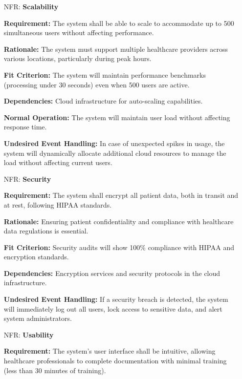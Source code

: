 \documentclass[12pt]{article}
\newcounter{nfrnum} %
\begin{document}
\begin{itemize}
\item[NFR\refstepcounter{nfrnum}\thenfrnum \label{NFR_Scalability}:] \textbf{Scalability}  

    \textbf{Requirement:} The system shall be able to scale to accommodate up to 500 simultaneous users without affecting performance.  
  
    \textbf{Rationale:} The system must support multiple healthcare providers across various locations, particularly during peak hours.  
  
    \textbf{Fit Criterion:} The system will maintain performance benchmarks (processing under 30 seconds) even when 500 users are active.  
  
    \textbf{Dependencies:} Cloud infrastructure for auto-scaling capabilities.  
  
    \textbf{Normal Operation:} The system will maintain user load without affecting response time.  
  
    \textbf{Undesired Event Handling:} In case of unexpected spikes in usage, the system will dynamically allocate additional cloud resources to manage the load without affecting current users.

\item[NFR\refstepcounter{nfrnum}\thenfrnum \label{NFR_Security}:] \textbf{Security}  

    \textbf{Requirement:} The system shall encrypt all patient data, both in transit and at rest, following HIPAA standards.  
  
    \textbf{Rationale:} Ensuring patient confidentiality and compliance with healthcare data regulations is essential.  
  
    \textbf{Fit Criterion:} Security audits will show 100\% compliance with HIPAA and encryption standards.  
  
    \textbf{Dependencies:} Encryption services and security protocols in the cloud infrastructure.  
  
    \textbf{Undesired Event Handling:} If a security breach is detected, the system will immediately log out all users, lock access to sensitive data, and alert system administrators.

\item[NFR\refstepcounter{nfrnum}\thenfrnum \label{NFR_Usability}:] \textbf{Usability}  

    \textbf{Requirement:} The system’s user interface shall be intuitive, allowing healthcare professionals to complete documentation with minimal training (less than 30 minutes of training).  
  

\end{itemize}
\end{document}
